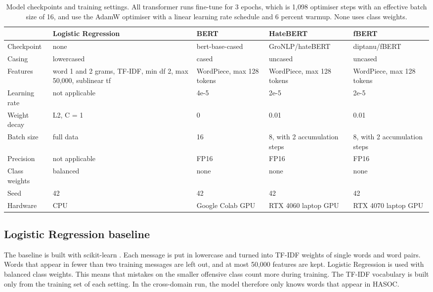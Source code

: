 \documentclass[11pt,a4paper]{article}
\begin{document}
\begin{table}[H]
\centering
\caption{Model checkpoints and training settings. All transformer runs fine-tune for 3 epochs, which is 1,098 optimiser steps with an effective batch size of 16, and use the AdamW optimiser with a linear learning rate schedule and 6 percent warmup. None uses class weights.}
\label{tab:hyper}
\footnotesize
\setlength{\tabcolsep}{4pt}
\begin{tabular}{L{2.1cm}L{3.0cm}L{2.85cm}L{2.85cm}L{2.85cm}}
\toprule
 & Logistic Regression & BERT & HateBERT & fBERT \\
\midrule
Checkpoint & none & bert-base-cased & GroNLP\slash hateBERT & diptanu\slash fBERT \\
Casing & lowercased & cased & uncased & uncased \\
Features & word 1 and 2 grams, TF-IDF, min df 2, max 50,000, sublinear tf & WordPiece, max 128 tokens & WordPiece, max 128 tokens & WordPiece, max 128 tokens \\
Learning rate & not applicable & 4e-5 & 2e-5 & 2e-5 \\
Weight decay & L2, C = 1 & 0 & 0.01 & 0.01 \\
Batch size & full data & 16 & 8, with 2 accumulation steps & 8, with 2 accumulation steps \\
Precision & not applicable & FP16 & FP16 & FP16 \\
Class weights & balanced & none & none & none \\
Seed & 42 & 42 & 42 & 42 \\
Hardware & CPU & Google Colab GPU & RTX 4060 laptop GPU & RTX 4070 laptop GPU \\
\bottomrule
\end{tabular}
\end{table}

\subsection{Logistic Regression baseline}

The baseline is built with scikit-learn \citep{pedregosa2011scikit}. Each message is put in lowercase and turned into TF-IDF weights of single words and word pairs. Words that appear in fewer than two training messages are left out, and at most 50,000 features are kept. Logistic Regression is used with balanced class weights. This means that mistakes on the smaller offensive class count more during training. The TF-IDF vocabulary is built only from the training set of each setting. In the cross-domain run, the model therefore only knows words that appear in HASOC.
\end{document}
